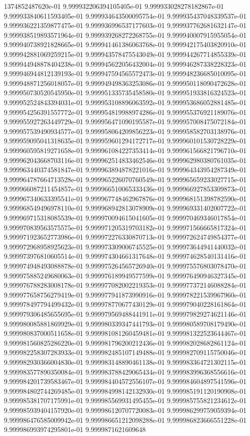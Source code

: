 1374852487620e-01	9.999932206394105405e-01	9.999933028278182867e-01	9.999933840611593405e-01	9.999934643500095754e-01	9.999935437048339537e-01	9.999936221359877475e-01	9.999936996537177603e-01	9.999937762681632147e-01	9.999938519893571964e-01	9.999939268272268755e-01	9.999940007915955054e-01	9.999940738921828665e-01	9.999941461386063768e-01	9.999942175403820910e-01	9.999942881069259215e-01	9.999943578475543049e-01	9.999944267714855339e-01	9.999944948878404238e-01	9.999945622056432004e-01	9.999946287338228323e-01	9.999946944812139193e-01	9.999947594565572473e-01	9.999948236685010095e-01	9.999948871256018057e-01	9.999949498363253086e-01	9.999950118090472628e-01	9.999950730520545950e-01	9.999951335735458580e-01	9.999951933816324523e-01	9.999952524843394031e-01	9.999953108896063592e-01	9.999953686052881485e-01	9.999954256391557772e-01	9.999954819988974286e-01	9.999955376921189076e-01	9.999955927263449729e-01	9.999956471090195587e-01	9.999957008475072184e-01	9.999957539490934577e-01	9.999958064209856223e-01	9.999958582703138976e-01	9.999959095041318635e-01	9.999959601294172717e-01	9.999960101530728229e-01	9.999960595819271658e-01	9.999961084227353414e-01	9.999961566821796710e-01	9.999962043668703116e-01	9.999962514833462546e-01	9.999962980380761035e-01	9.999963440374581847e-01	9.999963894878221016e-01	9.999964343954287349e-01	9.999964787664713528e-01	9.999965226070760549e-01	9.999965659233027715e-01	9.999966087211454857e-01	9.999966510065333436e-01	9.999966927853309873e-01	9.999967340633395541e-01	9.999967748462967876e-01	9.999968151398782590e-01	9.999968549496978110e-01	9.999968942813078909e-01	9.999969331402007722e-01	9.999969715318085539e-01	9.999970094615041605e-01	9.999970469346017854e-01	9.999970839563575575e-01	9.999971205319703182e-01	9.999971566665817324e-01	9.999971923652773986e-01	9.999972276330870713e-01	9.999972624749854377e-01	9.999972968958925623e-01	9.999973309006745525e-01	9.999973644941440032e-01	9.999973976810605514e-01	9.999974304661317648e-01	9.999974628540131416e-01	9.999974948493088878e-01	9.999975264565726940e-01	9.999975576803078470e-01	9.999975885249680063e-01	9.999976189949577599e-01	9.999976490946327345e-01	9.999976788283008178e-01	9.999977082002219353e-01	9.999977372146088284e-01	9.999977658756279419e-01	9.999977941873990916e-01	9.999978221539967960e-01	9.999978497794499432e-01	9.999978770677430129e-01	9.999979040228161864e-01	9.999979306485655695e-01	9.999979569488441911e-01	9.999979829274621146e-01	9.999980085881869929e-01	9.999980339347441793e-01	9.999980589708179490e-01	9.999980837000511658e-01	9.999981081260459481e-01	9.999981322523644467e-01	9.999981560825286220e-01	9.999981796200212436e-01	9.999982028682861124e-01	9.999982258307283933e-01	9.999982485107149488e-01	9.999982709115750046e-01	9.999982930366004830e-01	9.999983148890461138e-01	9.999983364721302115e-01	9.999983577890350084e-01	9.999983788429065434e-01	9.999983996368556616e-01	9.999984201739583467e-01	9.999984404572556107e-01	9.999984604897541596e-01	9.999984802744269485e-01	9.999984998142132930e-01	9.999985191120190908e-01	9.999985381707175991e-01	9.999985569931495455e-01	9.999985755821234612e-01	9.999985939404157920e-01	9.999986120707720083e-01	9.999986299759059394e-01	9.999986476585009942e-01	9.999986651212098288e-01	9.999986823666551228e-01	9.999986993974295801e-01	9.9999871621609648